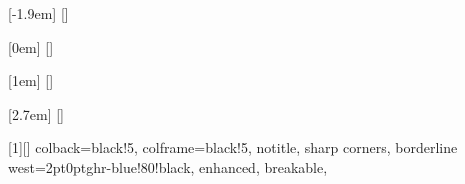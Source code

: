 \let\cleardoublepage\clearpage


\usepackage{titletoc}

\contentsmargin[1cm]{0cm}

[-1.9em]{\vskip6pt\LARGE\bfseries\sffamily}
{\thecontentslabel\enspace}
{\hspace{.5em}}
{ \hfill\contentspage}[\vskip 0pt]

[0em]{\medskip\Large\bfseries\sffamily}
{\thecontentslabel\enspace}
{\hspace{1.05em}}
{ \hfill\contentspage}[\vskip 4pt]

[1em]{\mdseries\sffamily}
{\thecontentslabel\enspace}
{}
{\quad\contentspage}[\vskip 4pt]

[2.7em]{\mdseries\sffamily}
{\thecontentslabel\enspace}
{}
{\quad\contentspage}[\vskip 3pt]

\usepackage{etoolbox}
\pretocmd{\contentsname}{\sffamily}{}{}


\setlength\marginparpush{15pt}


\makeatletter
\renewcommand{\footnotelayout}{\@tufte@sidenote@font\@tufte@sidenote@justification\linespread{0.5}}
\makeatother


\makeatletter
\renewcommand\marginnote[2][0pt]{%
    \ifthenelse{\boolean{@tufte@loadnatbib}}{%
        \let\cite\@tufte@infootnote@cite%
    }{}%
    \gdef\@tufte@citations{}%
    \marginpar{\setstretch{0.5}\hbox{}\vspace*{#1}\@tufte@marginnote@font\@tufte@marginnote@justification\@tufte@margin@par\vspace*{-1\baselineskip}\noindent #2}%
    \@tufte@print@citations%
    \ifthenelse{\boolean{@tufte@loadnatbib}}{%
        \let\cite\@tufte@normal@cite%
    }{}%
}
\makeatother


\usepackage[most]{tcolorbox}

[1][]{%
    colback=black!5,
    colframe=black!5,
    notitle,
    sharp corners,
    borderline west={2pt}{0pt}{ghr-blue!80!black},
    enhanced,
    breakable,
    }

\renewcommand{\quote}{\newquote}
\renewcommand{\endquote}{\endnewquote}




